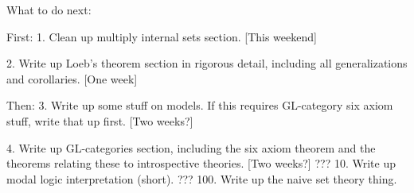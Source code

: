 What to do next:

First:
1. Clean up multiply internal sets section. [This weekend]

2. Write up Loeb's theorem section in rigorous detail, including all generalizations and corollaries. [One week]

Then:
3. Write up some stuff on models. If this requires GL-category six axiom stuff, write that up first. [Two weeks?]

4. Write up GL-categories section, including the six axiom theorem and the theorems relating these to introspective theories. [Two weeks?]
???
10. Write up modal logic interpretation (short).
???
100. Write up the naive set theory thing.